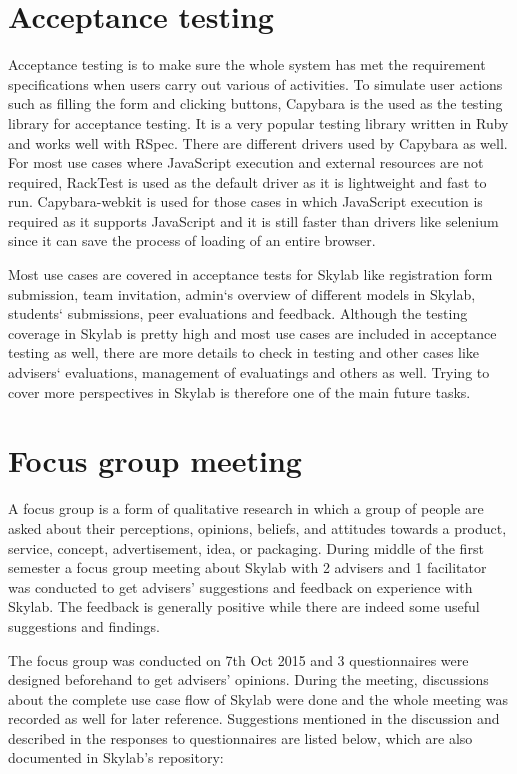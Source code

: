 \section{Acceptance testing} \label{acceptancetesting}

Acceptance testing is to make sure the whole system has met the requirement specifications when users carry out various of activities\cite{citationacceptancetesting}. To simulate user actions such as filling the form and clicking buttons, Capybara is the used as the testing library for acceptance testing. It is a very popular testing library written in Ruby and works well with RSpec\cite{citationcapybara}. There are different drivers used by Capybara as well. For most use cases where JavaScript execution and external resources are not required, RackTest is used as the default driver as it is lightweight and fast to run\cite{citationcapybara}. Capybara-webkit is used for those cases in which JavaScript execution is required as it supports JavaScript and it is still faster than drivers like selenium since it can save the process of loading of an entire browser\cite{citationcapybara}.

Most use cases are covered in acceptance tests for Skylab like registration form submission, team invitation, admin`s overview of different models in Skylab, students` submissions, peer evaluations and feedback. Although the testing coverage in Skylab is pretty high and most use cases are included in acceptance testing as well, there are more details to check in testing and other cases like advisers` evaluations, management of evaluatings and others as well. Trying to cover more perspectives in Skylab is therefore one of the main future tasks.

\section{Focus group meeting}

A focus group is a form of qualitative research in which a group of people are asked about their perceptions, opinions, beliefs, and attitudes towards a product, service, concept, advertisement, idea, or packaging\cite{citationfocusgroup}. During middle of the first semester a focus group meeting about Skylab with 2 advisers and 1 facilitator was conducted to get advisers' suggestions and feedback on experience with Skylab. The feedback is generally positive while there are indeed some useful suggestions and findings.

The focus group was conducted on 7th Oct 2015 and 3 questionnaires were designed beforehand to get advisers' opinions. During the meeting, discussions about the complete use case flow of Skylab were done and the whole meeting was recorded as well for later reference. Suggestions mentioned in the discussion and described in the responses to questionnaires are listed below, which are also documented in Skylab's repository\cite{citationskylabfocusgroup}:


